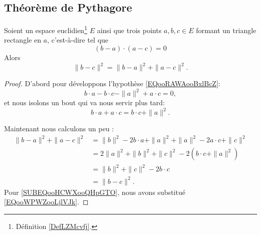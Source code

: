 \subsection{Théorème de Pythagore}

\begin{theorem}     \label{THOooHXHWooCpcDan}
	Soient un espace euclidien\footnote{Définition \ref{DefLZMcvfj}.} \( E\) ainsi que trois points \( a,b,c\in E\) formant un triangle rectangle en \( a\), c'est-à-dire tel que
	\begin{equation}        \label{EQooRAWAooBxlBcZ}
		(b-a)\cdot (a-c)=0
	\end{equation}
	Alors
	\begin{equation}
		\| b-c \|^2=\| b-a \|^2+\| a-c \|^2.
	\end{equation}
\end{theorem}

\begin{proof}
	D'abord pour développons l'hypothèse \eqref{EQooRAWAooBxlBcZ}:
	\begin{equation}
		b\cdot a-b\cdot c-\| a \|^2+a\cdot c=0,
	\end{equation}
	et nous isolons un bout qui va nous servir plus tard:
	\begin{equation}        \label{EQooWPWZooLjlVJk}
		b\cdot a+a\cdot c=b\cdot c+\| a \|^2.
	\end{equation}

	Maintenant nous calculons un peu :
	\begin{subequations}
		\begin{align}
			\| b-a \|^2+\| a-c \|^2 & =\| b \|^2-2b\cdot a+\| a \|^2+\| a \|^2-2a\cdot c+\| c \|^2                           \\
			                        & =2\| a \|^2+\| b \|^2+\| c \|^2-2(b\cdot c+\| a \|^2)      \label{SUBEQooHCWXooQHpGTO} \\
			                        & =\| b \|^2+\| c \|^2-2b\cdot c                                                         \\
			                        & =\| b-c \|^2.
		\end{align}
	\end{subequations}
	Pour \eqref{SUBEQooHCWXooQHpGTO}, nous avons substitué \eqref{EQooWPWZooLjlVJk}.
\end{proof}

